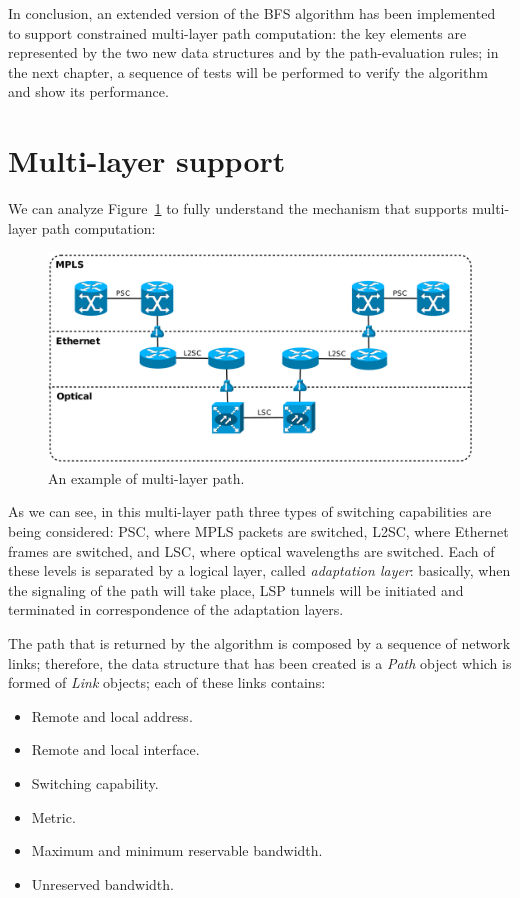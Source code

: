 \documentclass[10pt,a4paper]{report}
\begin{document}
In conclusion, an extended version of the BFS algorithm has been
implemented to support constrained multi-layer path computation: the
key elements are represented by the two new data structures and by the
path-evaluation rules; in the next chapter, a sequence of tests will
be performed to verify the algorithm and show its performance.

\newpage

\section{Multi-layer support}

We can analyze Figure~\ref{fig:multi_path} to fully understand the
mechanism that supports multi-layer path computation:

\begin{figure}[!htbp]
  \begin{center}
    \includegraphics[width=1\textwidth]{img/multi_path}
    \caption[Multi-layer path]{An example of multi-layer path.}
    \label{fig:multi_path}
  \end{center}
\end{figure}

As we can see, in this multi-layer path three types of switching
capabilities are being considered: PSC, where MPLS packets are
switched, L2SC, where Ethernet frames are switched, and LSC, where
optical wavelengths are switched. Each of these levels is separated by
a logical layer, called \textit{adaptation layer}: basically, when the
signaling of the path will take place, LSP tunnels will be initiated
and terminated in correspondence of the adaptation layers. 

The path that is returned by the algorithm is composed by a sequence
of network links; therefore, the data structure that has been created
is a \textit{Path} object which is formed of \textit{Link} objects;
each of these links contains:
\begin{itemize}
\item Remote and local address.
\item Remote and local interface.
\item Switching capability.
\item Metric.
\item Maximum and minimum reservable bandwidth.
\item Unreserved bandwidth.
\end{itemize}
\end{document}
